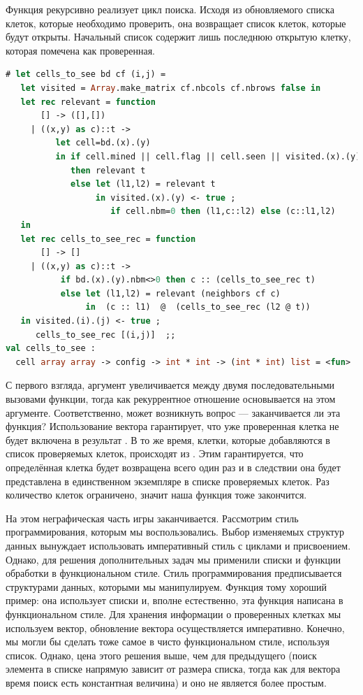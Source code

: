 Функция  рекурсивно реализует цикл поиска. Исходя из 
обновляемого списка клеток, которые необходимо проверить, она возвращает список 
клеток, которые будут открыты. Начальный список содержит лишь последнюю открытую 
клетку, которая помечена как проверенная.

\begin{lstlisting}[language=OCaml]
# let cells_to_see bd cf (i,j) = 
   let visited = Array.make_matrix cf.nbcols cf.nbrows false in 
   let rec relevant = function 
       [] -> ([],[])
     | ((x,y) as c)::t -> 
          let cell=bd.(x).(y)
          in if cell.mined || cell.flag || cell.seen || visited.(x).(y) 
             then relevant t
             else let (l1,l2) = relevant t 
                  in visited.(x).(y) <- true ;
                     if cell.nbm=0 then (l1,c::l2) else (c::l1,l2)
   in 
   let rec cells_to_see_rec = function 
       [] -> []  
     | ((x,y) as c)::t -> 
           if bd.(x).(y).nbm<>0 then c :: (cells_to_see_rec t)
           else let (l1,l2) = relevant (neighbors cf c)
                in  (c :: l1)  @  (cells_to_see_rec (l2 @ t))
   in visited.(i).(j) <- true ;
      cells_to_see_rec [(i,j)]  ;;
val cells_to_see :
  cell array array -> config -> int * int -> (int * int) list = <fun>
\end{lstlisting}

С первого взгляда, аргумент  увеличивается между 
двумя последовательными вызовами функции, тогда как рекуррентное отношение 
основывается на этом аргументе. Соответственно, может возникнуть вопрос --- 
заканчивается ли эта функция? Использование вектора  гарантирует, 
что уже проверенная клетка не будет включена в результат . В то 
же время, клетки, которые добавляются в список проверяемых клеток, происходят 
из . Этим гарантируется, что определённая клетка будет 
возвращена  всего один раз и в следствии она будет представлена 
в единственном экземпляре в списке проверяемых клеток. Раз количество клеток 
ограничено, значит наша функция тоже закончится.

На этом неграфическая часть игры заканчивается. Рассмотрим стиль 
программирования, которым мы воспользовались. Выбор изменяемых структур данных 
вынуждает использовать императивный стиль с циклами и присвоением. Однако, для 
решения дополнительных задач мы применили списки и функции обработки в 
функциональном стиле. Стиль программирования предписывается структурами данных, 
которыми мы манипулируем. Функция  тому хороший пример: 
она использует списки и, вполне естественно, эта функция написана в 
функциональном стиле. Для хранения информации о проверенных клетках мы 
используем вектор, обновление вектора осуществляется императивно. Конечно, мы 
могли бы сделать тоже самое в чисто функциональном стиле, используя список. 
Однако, цена этого решения выше, чем для предыдущего (поиск элемента в списке 
напрямую зависит от размера списка, тогда как для вектора время поиск есть 
константная величина) и оно не является более простым.

